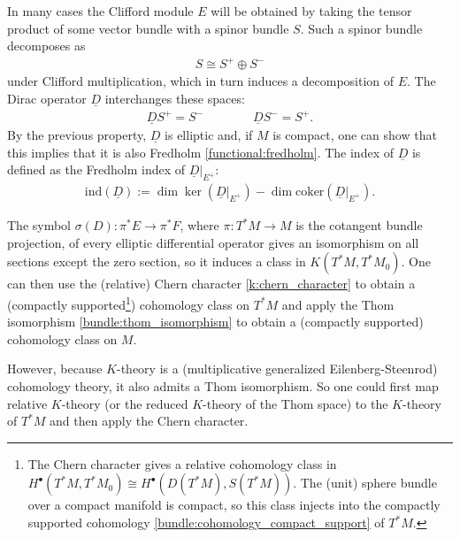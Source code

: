     \begin{definition}[Index]
        In many cases the Clifford module $E$ will be obtained by taking the tensor product of some vector bundle with a spinor bundle $S$. Such a spinor bundle decomposes as
        \begin{gather}
            S\cong S^+\oplus S^-
        \end{gather}
        under Clifford multiplication, which in turn induces a decomposition of $E$. The Dirac operator $\underline{D}$ interchanges these spaces:
        \begin{gather}
            \underline{D}S^+=S^-\qquad\qquad\underline{D}S^-=S^+.
        \end{gather}
        By the previous property, $\underline{D}$ is elliptic and, if $M$ is compact, one can show that this implies that it is also Fredholm \ref{functional:fredholm}. The index of $\underline{D}$ is defined as the Fredholm index of $\underline{D}|_{E^+}$:
        \begin{gather}
            \mathrm{ind}(\underline{D}) := \dim\ker(\underline{D}|_{E^+})-\dim\mathrm{coker}(\underline{D}|_{E^+}).
        \end{gather}
    \end{definition}

    The symbol $\sigma(D):\pi^*E\rightarrow\pi^*F$, where $\pi:T^*M\rightarrow M$ is the cotangent bundle projection, of every elliptic differential operator gives an isomorphism on all sections except the zero section, so it induces a class in $K(T^*M,T^*M_0)$. One can then use the (relative) Chern character \ref{k:chern_character} to obtain a (compactly supported\footnote{The Chern character gives a relative cohomology class in $H^\bullet(T^*M,T^*M_0)\cong H^\bullet(D(T^*M),S(T^*M))$. The (unit) sphere bundle over a compact manifold is compact, so this class injects into the compactly supported cohomology \ref{bundle:cohomology_compact_support} of $T^*M$.}) cohomology class on $T^*M$ and apply the Thom isomorphism \ref{bundle:thom_isomorphism} to obtain a (compactly supported) cohomology class on $M$.

    However, because $K$-theory is a (multiplicative generalized Eilenberg-Steenrod) cohomology theory, it also admits a Thom isomorphism. So one could first map relative $K$-theory (or the reduced $K$-theory of the Thom space) to the $K$-theory of $T^*M$ and then apply the Chern character.

